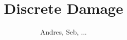 \documentclass[final,3p,times,authoryear]{elsarticle}
\begin{document}
\begin{frontmatter}



\title{Discrete Damage}


\author{Andres, Seb, ...}


\begin{abstract}

\end{abstract}



\begin{keyword}



\end{keyword}

\end{frontmatter}
\end{document}

